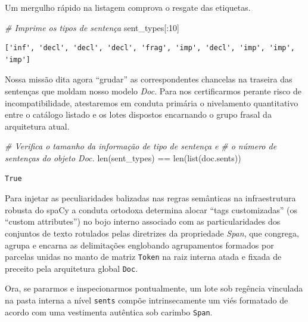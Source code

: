\documentclass[
  brazilian,
]{article}
\newenvironment{Shaded}{}{}
\newcommand{\BuiltInTok}[1]{#1}
\newcommand{\CommentTok}[1]{\textcolor[rgb]{0.38,0.63,0.69}{\textit{#1}}}
\newcommand{\DecValTok}[1]{\textcolor[rgb]{0.25,0.63,0.44}{#1}}
\newcommand{\NormalTok}[1]{#1}
\newcommand{\OperatorTok}[1]{\textcolor[rgb]{0.40,0.40,0.40}{#1}}
\begin{document}
Um mergulho rápido na listagem comprova o resgate das etiquetas.

\begin{Shaded}
\begin{Highlighting}[]
\CommentTok{\# Imprime os tipos de sentença}
\NormalTok{sent\_types[:}\DecValTok{10}\NormalTok{]}
\end{Highlighting}
\end{Shaded}

\begin{verbatim}
['inf', 'decl', 'decl', 'decl', 'frag', 'imp', 'decl', 'imp', 'imp', 'imp']
\end{verbatim}

Nossa missão dita agora ``grudar'' as correspondentes chancelas na
traseira das sentenças que moldam nosso modelo \emph{Doc}. Para nos
certificarmos perante risco de incompatibilidade, atestaremos em conduta
primária o nivelamento quantitativo entre o catálogo listado e os lotes
dispostos encarnando o grupo frasal da arquitetura atual.

\begin{Shaded}
\begin{Highlighting}[]
\CommentTok{\# Verifica o tamanho da informação de tipo de sentença e}
\CommentTok{\# o número de sentenças do objeto Doc.}
\BuiltInTok{len}\NormalTok{(sent\_types) }\OperatorTok{==} \BuiltInTok{len}\NormalTok{(}\BuiltInTok{list}\NormalTok{(doc.sents))}
\end{Highlighting}
\end{Shaded}

\begin{verbatim}
True
\end{verbatim}

Para injetar as peculiaridades balizadas nas regras semânticas na
infraestrutura robusta do spaCy a conduta ortodoxa determina alocar
``tags customizadas'' (os ``custom attributes'') no bojo interno
associado com as particularidades dos conjuntos de texto rotulados pelas
diretrizes da propriedade \emph{Span}, que congrega, agrupa e encarna as
delimitações englobando agrupamentos formados por parcelas unidas no
manto de matriz \texttt{Token} na raiz interna atada e fixada de
preceito pela arquitetura global \texttt{Doc}.

Ora, se pararmos e inspecionarmos pontualmente, um lote sob regência
vinculada na pasta interna a nível \texttt{sents} compõe intrinsecamente
um viés formatado de acordo com uma vestimenta autêntica sob carimbo
\texttt{Span}.
\end{document}
